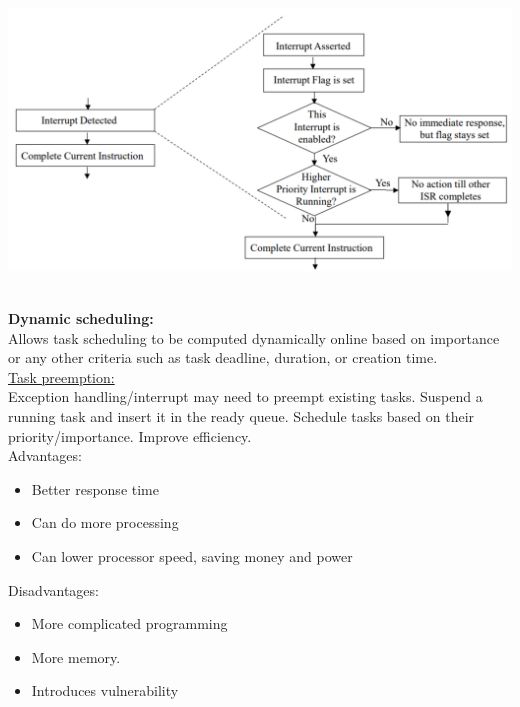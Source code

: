 \begin{minipage}{.49\columnwidth}
    \centering
    \includegraphics[width=\linewidth,height=\linewidth,keepaspectratio=false]{images/interrupt2.png} %
\end{minipage}\\
\textbf{Dynamic scheduling:}\\
Allows task scheduling to be computed dynamically online based on importance or any other
criteria such as task deadline, duration, or creation time.\\
\underline{Task preemption:}\\
Exception handling/interrupt may need to preempt existing tasks.
Suspend a running task and insert it in the ready queue. Schedule tasks based on their
priority/importance. Improve efficiency.\\
Advantages:
\begin{itemize}
    \item Better response time
    \item Can do more processing
    \item Can lower processor speed, saving money and power
\end{itemize}
Disadvantages:
\begin{itemize}
    \item More complicated programming
    \item More memory.
    \item Introduces vulnerability
\end{itemize}
